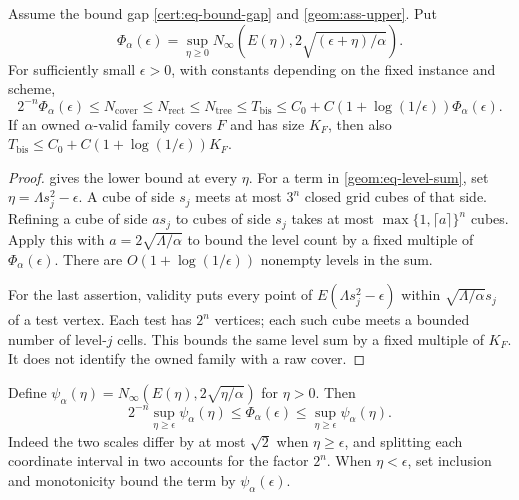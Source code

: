 \begin{theorem}\label{geom:thm-profile}
Assume the bound gap \cref{cert:eq-bound-gap} and
\cref{geom:ass-upper}. Put
\begin{equation}\label{geom:eq-profile}
 \Phi_\alpha(\epsilon)=\sup_{\eta\geq0}
 N_\infty\!\left(E(\eta),2\sqrt{(\epsilon+\eta)/\alpha}\right).
\end{equation}
For sufficiently small $\epsilon>0$, with constants depending on the
fixed instance and scheme,
\begin{equation}\label{geom:eq-profile-comparison}
 2^{-n}\Phi_\alpha(\epsilon)
 \leq N_{\mathrm{cover}}\leq N_{\mathrm{rect}}
 \leq N_{\mathrm{tree}}\leq T_{\mathrm{bis}}
 \leq C_0+C(1+\log(1/\epsilon))\Phi_\alpha(\epsilon).
\end{equation}
If an owned $\alpha$-valid family covers $F$ and has size $K_F$, then
also $T_{\mathrm{bis}}\leq C_0+C(1+\log(1/\epsilon))K_F$.
\end{theorem}
\begin{proof}
 gives the lower bound at every $\eta$.
For a term in \cref{geom:eq-level-sum}, set
$\eta=\Lambda s_j^2-\epsilon$. A cube of side $s_j$ meets at most
$3^n$ closed grid cubes of that side. Refining a cube of side $a s_j$
to cubes of side $s_j$ takes at most $\max\{1,\lceil a\rceil\}^n$
cubes. Apply this with $a=2\sqrt{\Lambda/\alpha}$ to bound the level
count by a fixed multiple of $\Phi_\alpha(\epsilon)$. There are
$O(1+\log(1/\epsilon))$ nonempty levels in the sum.

For the last assertion, validity puts every point of
$E(\Lambda s_j^2-\epsilon)$ within
$\sqrt{\Lambda/\alpha}s_j$ of a test vertex. Each test has $2^n$
vertices; each such cube meets a bounded number of level-$j$ cells.
This bounds the same level sum by a fixed multiple of $K_F$.
It does not identify the owned family with a raw cover.
\end{proof}

Define $\psi_\alpha(\eta)=
N_\infty(E(\eta),2\sqrt{\eta/\alpha})$ for $\eta>0$. Then
\begin{equation}\label{geom:eq-running}
 2^{-n}\sup_{\eta\geq\epsilon}\psi_\alpha(\eta)
 \leq\Phi_\alpha(\epsilon)
 \leq\sup_{\eta\geq\epsilon}\psi_\alpha(\eta).
\end{equation}
Indeed the two scales differ by at most $\sqrt2$ when $\eta\geq\epsilon$,
and splitting each coordinate interval in two accounts for the factor
$2^n$. When $\eta<\epsilon$, set inclusion and monotonicity bound the
term by $\psi_\alpha(\epsilon)$.

